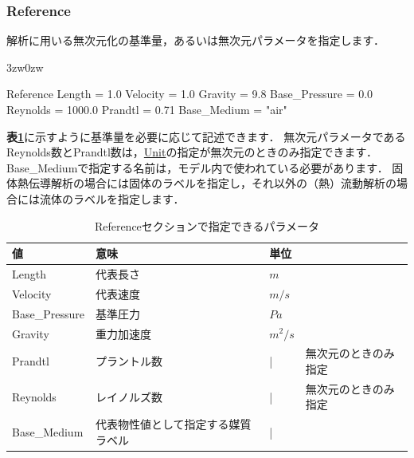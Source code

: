 \pagebreak
\subsubsection{Reference}

解析に用いる無次元化の\hypertarget{tgt:reference}{基準量}，あるいは無次元パラメータを指定します．

\begin{indentation}{3zw}{0zw}

{\small
\begin{program}
  Reference {
    Length        = 1.0
    Velocity      = 1.0
    Gravity       = 9.8
    Base_Pressure = 0.0
    Reynolds      = 1000.0
    Prandtl       = 0.71
    Base_Medium   = "air"
  }
\end{program}
}

\noindent \textbf{表\ref{tbl:ref_value}}に示すように基準量を必要に応じて記述できます．
無次元パラメータであるReynolds数とPrandtl数は，\hyperlink{tgt:unit}{Unit}の指定が無次元のときのみ指定できます．
Base\_Mediumで指定する名前は，モデル内で使われている必要があります．
固体熱伝導解析の場合には固体のラベルを指定し，それ以外の（熱）流動解析の場合には流体のラベルを指定します．

\begin{table}[htdp]
\caption{Referenceセクションで指定できるパラメータ}
\begin{center}
\small
\begin{tabular}{llll} \toprule
値 & 意味 & 単位\\ \midrule
Length & 代表長さ & $m$ &\\
Velocity & 代表速度 & $m/s$ &\\
Base\_Pressure & 基準圧力 & $Pa$ &\\
Gravity & 重力加速度 & $m^2/s$ &\\
Prandtl & プラントル数 & | & 無次元のときのみ指定\\
Reynolds & レイノルズ数 & | & 無次元のときのみ指定\\
Base\_Medium & 代表物性値として指定する媒質ラベル & | &\\ \bottomrule
\end{tabular}
\end{center}
\label{tbl:ref_value}
\end{table}

\end{indentation}



